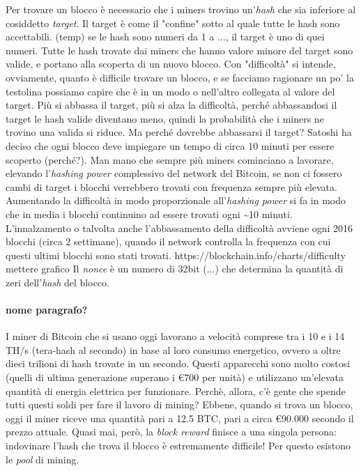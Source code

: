 \documentclass {article}
\begin{document}
Per trovare un blocco è necessario che i miners trovino un'\textit{hash} che sia inferiore al cosiddetto \textit{target}. Il target è come il "confine" sotto al quale tutte le hash sono accettabili.
(temp) se le hash sono numeri da 1 a ..., il target è uno di quei numeri.
Tutte le hash trovate dai miners che hanno valore minore del target sono valide, e portano alla scoperta di un nuovo blocco.
Con "difficoltà" si intende, ovviamente, quanto è difficile trovare un blocco, e se facciamo ragionare un po' la testolina possiamo capire che è in un modo o nell'altro collegata al valore del target.
Più si abbassa il target, più si alza la difficoltà, perché abbassandosi il target le hash valide diventano meno, quindi la probabilità che i miners ne trovino una valida si riduce.
Ma perché dovrebbe abbassarsi il target?
Satoshi ha deciso che ogni blocco deve impiegare un tempo di circa 10 minuti per essere scoperto (perché?).
Man mano che sempre più miners cominciano a lavorare, elevando l'\textit{hashing power} complessivo del network del Bitcoin, se non ci fossero cambi di target i blocchi verrebbero trovati con frequenza sempre più elevata.
Aumentando la difficoltà in modo proporzionale all'\textit{hashing power} si fa in modo che in media i blocchi continuino ad essere trovati ogni \textasciitilde 10 minuti.
L'innalzamento o talvolta anche l'abbassamento della difficoltà avviene ogni 2016 blocchi (circa 2 settimane), quando il network controlla la frequenza con cui questi ultimi blocchi sono stati trovati. https://blockchain.info/charts/difficulty mettere grafico
Il \textit{nonce} è un numero di 32bit (...) che determina la quantità di zeri dell'\textit{hash} del blocco.

\paragraph {nome paragrafo?}

I miner di Bitcoin che si usano oggi lavorano a velocità comprese tra i 10 e i 14 TH/s (tera-hash al secondo) in base al loro consumo energetico, ovvero a oltre dieci trilioni di hash trovate in un secondo.
Questi apparecchi sono molto costosi (quelli di ultima generazione superano i \euro{700} per unità) e utilizzano un'elevata quantità di energia elettrica per funzionare.
Perchè, allora, c'è gente che spende tutti questi soldi per fare il lavoro di mining?
Ebbene, quando si trova un blocco, oggi il miner riceve una quantità pari a 12.5 BTC, pari a circa \euro{90.000} secondo il prezzo attuale.
Quasi mai, però, la \textit{block reward} finisce a una singola persona: indovinare l'hash che trova il blocco è estremamente difficile!
Per questo esistono le \textit{pool} di mining.
\end{document}

